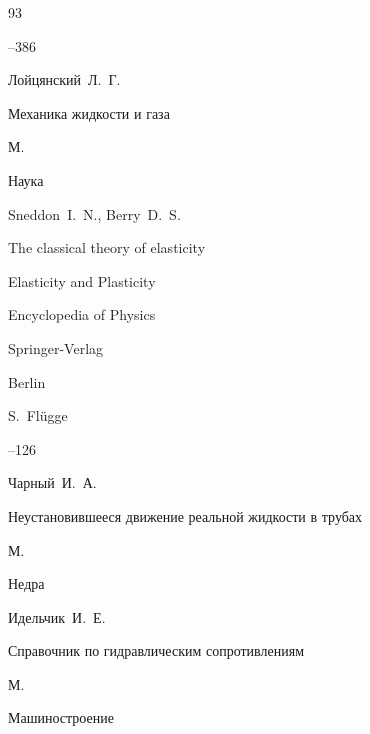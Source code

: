 \begin{thebibliography}{93}



–386





\by Лойцянский~Л.~Г.

\book Механика жидкости и газа

\publaddr М.

\publ Наука






\by Sneddon~I.~N.,  Berry~D.~S.

\paper The classical theory of elasticity

\inbook Elasticity and Plasticity

\serial Encyclopedia of Physics 

\publ Springer-Verlag

\publaddr Berlin

\ed S.~Fl\"ugge 



–126







\by Чарный~И.~А.

\book Неустановившееся движение реальной жидкости в трубах

\publaddr М.

\publ Недра








\by Идельчик~И.~Е.

\book Справочник по гидравлическим сопротивлениям

\publaddr М.

\publ Машиностроение








\end{thebibliography}
